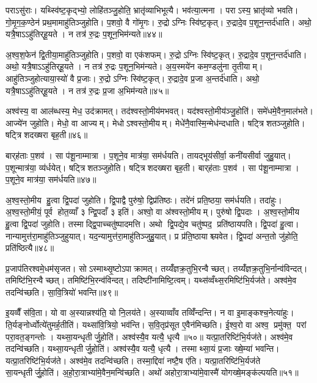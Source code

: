 पराऽसु॑राः। यथ्स्वि॑ष्ट॒कृद्भ्यो॒ लोहि॑तञ्जु॒होति॒ भ्रातृ॑व्याभिभूत्यै। भव॑त्या॒त्मना। पराऽस्य॒ भ्रातृ॑व्यो भवति। गो॒मृ॒ग॒क॒ण्ठेन॑ प्रथ॒मामाहु॑तिञ्जुहोति। प॒शवो॒ वै गो॑मृ॒गः। रु॒द्रोऽग्निः स्वि॑ष्ट॒कृत्। रु॒द्रादे॒व प॒शून॒न्तर्द॑धाति। अथो॒ यत्रै॒षाऽऽहु॑तिर्‌हू॒यते। न तत्र॑ रु॒द्रः प॒शून॒भिम॑न्यते॥४४॥

अ॒श्व॒श॒फेन॑ द्वि॒तीया॒माहु॑तिञ्जुहोति। प॒शवो॒ वा एक॑शफम्। रु॒द्रोऽग्निः स्वि॑ष्ट॒कृत्। रु॒द्रादे॒व प॒शून॒न्तर्द॑धाति। अथो॒ यत्रै॒षाऽऽहु॑तिर्‌हू॒यते। न तत्र॑ रु॒द्रः प॒शून॒भिम॑न्यते। अ॒य॒स्मये॑न कम॒ण्डलु॑ना तृ॒तीयाम्। आहु॑तिञ्जुहोत्याया॒स्यो॑ वै प्र॒जाः। रु॒द्रोऽग्निः स्वि॑ष्ट॒कृत्। रु॒द्रादे॒व प्र॒जा अ॒न्तर्द॑धाति। अथो॒ यत्रै॒षाऽऽहु॑तिर्‌हू॒यते। न तत्र॑ रु॒द्रः प्र॒जा अ॒भिम॑न्यते॥४५॥\anuvakamend[द॒धा॒त्यभ॑वन्मन्यते प्र॒जा अ॒न्तर्द॑धाति॒ द्वे च॑ ]

अश्व॑स्य॒ वा आल॑ब्धस्य॒ मेध॒ उद॑क्रामत्। तद॑श्वस्तो॒मीय॑मभवत्। यद॑श्वस्तो॒मीय॑ञ्जु॒होति॑। समे॑धमे॒वैन॒माल॑भते। आज्ये॑न जुहोति। मेधो॒ वा आज्यम्। मेधोऽश्वस्तो॒मीयम्। मेधे॑नै॒वास्मि॒न्मेध॑न्दधाति। षट्त्रिशतञ्जुहोति। षट्त्रिशदख्षरा बृह॒ती॥४६॥

बार्‌ह॑ताः प॒शव॑। सा प॑शू॒नाम्मात्रा। प॒शूने॒व मात्र॑या॒ सम॑र्धयति। तायद्भूय॑सीर्वा॒ कनी॑यसीर्वा जुहु॒यात्। प॒शून्मात्र॑या॒ व्य॑र्धयेत्। षट्त्रिशतञ्जुहोति। षट्त्रिशदख्षरा बृह॒ती। बार्‌ह॑ताः प॒शव॑। सा प॑शू॒नाम्मात्रा। प॒शूने॒व मात्र॑या॒ सम॑र्धयति॥४७॥

अ॒श्व॒स्तो॒मीय हु॒त्वा द्वि॒पदा॑ जुहोति। द्वि॒पाद्वै पुरु॑षो॒ द्विप्र॑तिष्ठः। तदे॑नं प्रति॒ष्ठया॒ सम॑र्धयति। तदा॑हुः। अ॒श्व॒स्तो॒मीयं॒ पूर्व होत॒व्याँ ३ न्द्वि॒पदाँ ३ इति॑। अश्वो॒ वा अ॑श्वस्तो॒मीयम्। पुरु॑षो द्वि॒पदाः। अ॒श्व॒स्तो॒मीय हु॒त्वा द्वि॒पदा॑ जुहोति। तस्माद्द्वि॒पाच्चतु॑ष्पादमत्ति। अथो द्वि॒पद्ये॒व चतु॑ष्पद॒ प्रति॑ष्ठायपति। द्वि॒पदा॑ हु॒त्वा। नान्यामुत्त॑रा॒माहु॑तिञ्जुहुयात्। यद॒न्यामुत्त॑रा॒माहु॑तिञ्जुहु॒यात्। प्र प्र॑ति॒ष्ठायाश्च्यवेत। द्वि॒पदा॑ अन्त॒तो जु॑होति॒ प्रति॑ष्ठित्यै॥४८॥

प्र॒जाप॑तिरश्वमे॒धम॑सृजत। सोऽस्माथ्सृ॒ष्टोऽपाक्रामत्। तय्यँ॑ज्ञक्र॒तुभि॒रन्वैच्छत्। तय्यँ॑ज्ञक्र॒तुभि॒र्नान्व॑विन्दत्। तमिष्टि॑भि॒रन्वैच्छत्। तमिष्टि॑भि॒रन्व॑विन्दत्। तदिष्टी॑नामिष्टि॒त्वम्। यथ्स॑व्वँथ्स॒रमिष्टि॑भि॒र्यज॑ते। अश्व॑मे॒व तदन्वि॑च्छति। सा॒वि॒त्रियो॑ भवन्ति॥४९॥

इ॒यव्वैँ स॑वि॒ता। यो वा अ॒स्यान्नश्य॑ति॒ यो नि॒लय॑ते। अ॒स्याव्वाँव तव्विँ॑न्दन्ति। न वा इ॒माङ्कश्च॒नेत्या॑हुः। ति॒र्यङ्नोर्ध्वोत्ये॑तुमर्ह॒तीति॑। यथ्सा॑वि॒त्रियो॒ भव॑न्ति। स॒वि॒तृप्र॑सूत ए॒वैन॑मिच्छति। ई॒श्व॒रो वा अश्व॒ प्रमु॑क्त॒ परां परा॒वत॒ङ्गन्तोः। यथ्सा॒यन्धृतीर्जु॒होति॑। अश्व॑स्यै॒व यत्यै॒ धृत्यै॥५०॥ यत्प्रा॒तरिष्टि॑भि॒र्यज॑ते। अश्व॑मे॒व तदन्वि॑च्छति। यथ्सा॒यन्धृतीर्जु॒होति॑। अश्व॑स्यै॒व यत्यै॒ धृत्यै। तस्माथ्सा॒यं प्र॒जाः ख्षे॒म्या॑ भवन्ति। यत्प्रा॒तरिष्टि॑भि॒र्यज॑ते। अश्व॑मे॒व तदन्वि॑च्छति। तस्मा॒द्दिवा॑ नष्टै॒ष ए॑ति। यत्प्रा॒तरिष्टि॑भि॒र्यज॑ते सा॒यन्धृतीर्जु॒होति॑। अ॒हो॒रा॒त्राभ्या॑मे॒वैन॒मन्वि॑च्छति। अथो॑ अहोरा॒त्राभ्या॑मे॒वास्मै॑ योगख्षे॒मङ्क॑ल्पयति॥५१॥\anuvakamend[भ॒व॒न्ति॒ धृत्या॑ एन॒मन्वि॑च्छ॒त्येक॑ञ्च]

